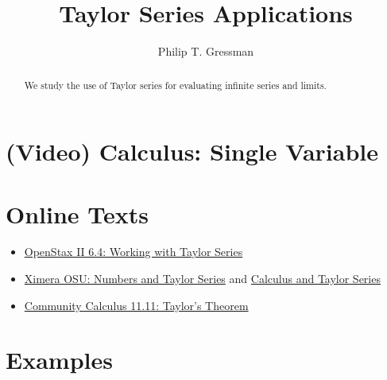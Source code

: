 \documentclass{ximera}
\title{Taylor Series Applications}
\author{Philip T. Gressman}
\begin{document}
\begin{abstract}
We study the use of Taylor series for evaluating infinite series and limits.
\end{abstract}
\maketitle

\section*{(Video) Calculus: Single Variable}

\section*{Online Texts}
\begin{itemize}
\item \href{https://openstax.org/books/calculus-volume-2/pages/6-4-working-with-taylor-series}{OpenStax II 6.4: Working with Taylor Series}
\item \href{https://ximera.osu.edu/mooculus/calculus2/numbersAndTaylorSeries/digInNumbersAndTaylorSeries}{Ximera OSU: Numbers and Taylor Series} and \href{https://ximera.osu.edu/mooculus/calculus2/calculusAndTaylorSeries/titlePage}{Calculus and Taylor Series}
\item \href{https://www.whitman.edu/mathematics/calculus_online/section11.11.html}{Community Calculus 11.11: Taylor's Theorem}
\end{itemize}

\section*{Examples}

\begin{example}

\end{example}

\begin{example}

\end{example}
\end{document}
